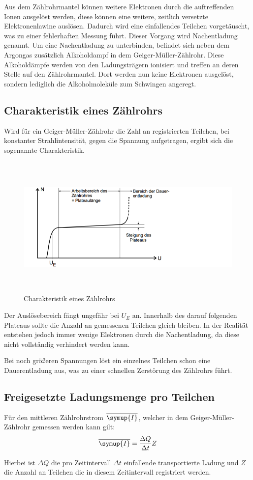 Aus dem Zählrohrmantel können weitere Elektronen durch die auftreffenden Ionen ausgelöst werden, diese können eine weitere,
zeitlich versetzte Elektronenlawine auslösen. Dadurch wird eine einfallendes Teilchen vorgetäuscht, was zu einer
fehlerhaften Messung führt. Dieser Vorgang wird Nachentladung genannt. Um eine Nachentladung zu unterbinden, befindet
sich neben dem Argongas zusätzlich Alkoholdampf in dem Geiger-Müller-Zählrohr. Diese Alkoholdämpfe
werden von den Ladungsträgern ionisiert und treffen an deren Stelle auf den Zählrohrmantel. Dort werden nun keine
Elektronen ausgelöst, sondern lediglich die Alkoholmoleküle zum Schwingen angeregt.

\subsection{Charakteristik eines Zählrohrs}

Wird für ein  Geiger-Müller-Zählrohr die Zahl an registrierten Teilchen, bei konstanter Strahlintensität, gegen die Spannung
aufgetragen, ergibt sich die sogenannte Charakteristik.

\begin{figure}[H]
  \centering
  \includegraphics[height=7cm]{charakteristik.PNG}
  \caption{Charakteristik eines Zählrohrs \cite{sample}}
  \label{fig:Linienspektrum}
\end{figure}

Der Auslösebereich fängt ungefähr bei $U_E$ an. Innerhalb des darauf folgenden Plateaus sollte die
Anzahl an gemessenen Teilchen gleich bleiben. In der Realität entstehen jedoch immer wenige Elektronen durch die Nachentladung,
da diese nicht vollständig verhindert werden kann.

Bei noch größeren Spannungen löst ein einzelnes Teilchen schon eine Dauerentladung aus, was zu einer schnellen Zerstörung
des Zählrohrs führt.


\subsection{Freigesetzte Ladungsmenge pro Teilchen}

Für den mittleren Zählrohrstrom $\overline{\symup{I}}$, welcher in dem Geiger-Müller-Zählrohr gemessen werden kann gilt:
\begin{align}
  \overline{\symup{I}} = \frac{\Delta Q}{\Delta t} Z
\end{align}

Hierbei ist $\Delta Q$ die pro Zeitintervall $\Delta t$ einfallende transportierte Ladung und $Z$ die Anzahl an Teilchen die in diesem
Zeitintervall registriert werden.
